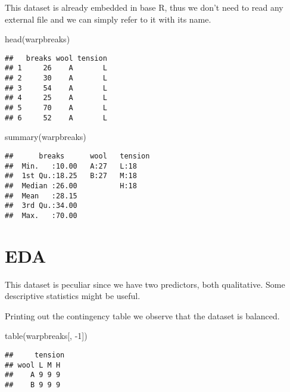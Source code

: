 \documentclass[
  oneside]{book}
\newenvironment{Shaded}{\begin{snugshade}}{\end{snugshade}}
\newcommand{\DecValTok}[1]{\textcolor[rgb]{0.00,0.00,0.81}{#1}}
\newcommand{\FunctionTok}[1]{\textcolor[rgb]{0.00,0.00,0.00}{#1}}
\newcommand{\NormalTok}[1]{#1}
\newcommand{\SpecialCharTok}[1]{\textcolor[rgb]{0.00,0.00,0.00}{#1}}
\begin{document}
This dataset is already embedded in base R, thus we don't need
to read any external file and we can simply refer to it
with its name.

\begin{Shaded}
\begin{Highlighting}[]
\FunctionTok{head}\NormalTok{(warpbreaks)}
\end{Highlighting}
\end{Shaded}

\begin{verbatim}
##   breaks wool tension
## 1     26    A       L
## 2     30    A       L
## 3     54    A       L
## 4     25    A       L
## 5     70    A       L
## 6     52    A       L
\end{verbatim}

\begin{Shaded}
\begin{Highlighting}[]
\FunctionTok{summary}\NormalTok{(warpbreaks)}
\end{Highlighting}
\end{Shaded}

\begin{verbatim}
##      breaks      wool   tension
##  Min.   :10.00   A:27   L:18   
##  1st Qu.:18.25   B:27   M:18   
##  Median :26.00          H:18   
##  Mean   :28.15                 
##  3rd Qu.:34.00                 
##  Max.   :70.00
\end{verbatim}

\hypertarget{eda-1}{%
\section{EDA}\label{eda-1}}

This dataset is peculiar since we have two predictors, both qualitative.
Some descriptive statistics might be useful.

Printing out the contingency table we observe that the dataset
is balanced.

\begin{Shaded}
\begin{Highlighting}[]
\FunctionTok{table}\NormalTok{(warpbreaks[, }\SpecialCharTok{{-}}\DecValTok{1}\NormalTok{])}
\end{Highlighting}
\end{Shaded}

\begin{verbatim}
##     tension
## wool L M H
##    A 9 9 9
##    B 9 9 9
\end{verbatim}
\end{document}
